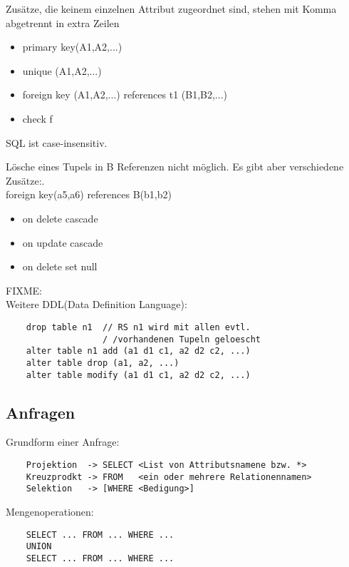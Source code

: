 Zus\"atze, die keinem einzelnen Attribut zugeordnet sind, stehen mit Komma abgetrennt in extra Zeilen
\begin{itemize}
    \item primary key(A1,A2,...)
    \item unique (A1,A2,...)
    \item foreign key (A1,A2,...) references t1 (B1,B2,...)
    \item check f
\end{itemize}
\begin{remark}
    SQL ist case-insensitiv.
\end{remark}
L\"osche eines Tupels in B Referenzen nicht m\"oglich.
Es gibt aber verschiedene Zus\"atze:.\\
foreign key(a5,a6) references B(b1,b2)
\begin{itemize}
    \item on delete cascade
    \item on update cascade
    \item on delete set null
\end{itemize}
FIXME:\\
Weitere DDL(Data Definition Language):
\begin{verbatim}
    drop table n1  // RS n1 wird mit allen evtl.
                   / /vorhandenen Tupeln geloescht
    alter table n1 add (a1 d1 c1, a2 d2 c2, ...)
    alter table drop (a1, a2, ...)
    alter table modify (a1 d1 c1, a2 d2 c2, ...)
\end{verbatim}

\subsection{Anfragen}
Grundform einer Anfrage:
\begin{verbatim}
    Projektion  -> SELECT <List von Attributsnamene bzw. *>
    Kreuzprodkt -> FROM   <ein oder mehrere Relationennamen>
    Selektion   -> [WHERE <Bedigung>]
\end{verbatim}
Mengenoperationen:
\begin{verbatim}
    SELECT ... FROM ... WHERE ... 
    UNION
    SELECT ... FROM ... WHERE ...
\end{verbatim}

